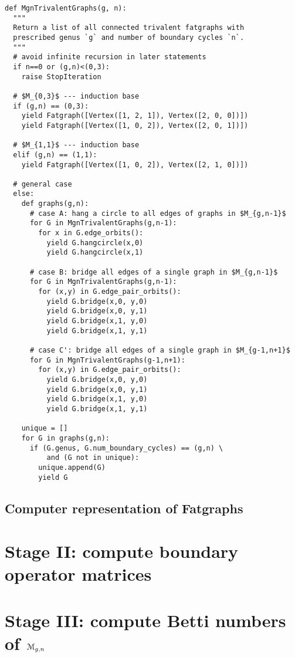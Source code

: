 \begin{lstlisting}[name=MgnTrivalentGraphs,firstnumber=1]
def MgnTrivalentGraphs(g, n):
  """
  Return a list of all connected trivalent fatgraphs with
  prescribed genus `g` and number of boundary cycles `n`.
  """
  # avoid infinite recursion in later statements
  if n==0 or (g,n)<(0,3):
    raise StopIteration

  # $M_{0,3}$ --- induction base
  if (g,n) == (0,3):
    yield Fatgraph([Vertex([1, 2, 1]), Vertex([2, 0, 0])])
    yield Fatgraph([Vertex([1, 0, 2]), Vertex([2, 0, 1])])

  # $M_{1,1}$ --- induction base
  elif (g,n) == (1,1):
    yield Fatgraph([Vertex([1, 0, 2]), Vertex([2, 1, 0])])

  # general case
  else:
    def graphs(g,n):
      # case A: hang a circle to all edges of graphs in $M_{g,n-1}$
      for G in MgnTrivalentGraphs(g,n-1):
        for x in G.edge_orbits():
          yield G.hangcircle(x,0)
          yield G.hangcircle(x,1)

      # case B: bridge all edges of a single graph in $M_{g,n-1}$
      for G in MgnTrivalentGraphs(g,n-1):
        for (x,y) in G.edge_pair_orbits():
          yield G.bridge(x,0, y,0)
          yield G.bridge(x,0, y,1)
          yield G.bridge(x,1, y,0)
          yield G.bridge(x,1, y,1)

      # case C': bridge all edges of a single graph in $M_{g-1,n+1}$
      for G in MgnTrivalentGraphs(g-1,n+1):
        for (x,y) in G.edge_pair_orbits():
          yield G.bridge(x,0, y,0)
          yield G.bridge(x,0, y,1)
          yield G.bridge(x,1, y,0)
          yield G.bridge(x,1, y,1)

    unique = []
    for G in graphs(g,n):
      if (G.genus, G.num_boundary_cycles) == (g,n) \
          and (G not in unique):
        unique.append(G)
        yield G
\end{lstlisting}


\subsection{Computer representation of Fatgraphs}
\label{sec:stage1-fatgraphs}



\section[Stage II]{Stage II: compute boundary operator matrices}
\label{sec:stage-ii}

\section[Stage III]{Stage III: compute Betti numbers of $\mathcal{M}_{g,n}$}
\label{sec:stage-iii}



